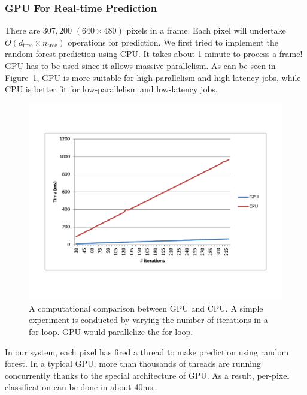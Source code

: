 \subsubsection{GPU For Real-time Prediction} 
There are $307,200$ $(640\times 480)$ pixels in a frame. Each pixel will undertake $O(d_{\text{tree}}\times n_{\text{tree}})$ operations for prediction. We first tried to implement the random forest prediction using CPU. It takes about 1 minute to process a frame! GPU has to be used since it allows massive parallelism. As can be seen in Figure~\ref{fig: GPUvsCPU}, GPU is more suitable for high-parallelism and high-latency jobs, while CPU is better fit for low-parallelism and low-latency jobs. 

\begin{figure}
	\includegraphics[width=0.45 \textwidth]{fig/GPUvsCPU.pdf}   
    \caption{A computational comparison between GPU and CPU. A simple experiment is conducted by varying the number of iterations in a for-loop. GPU would parallelize the for loop.}
    \label{fig: GPUvsCPU}
\end{figure}

In our system, each pixel has fired a thread to make prediction using random forest. In a typical GPU, more than thousands of threads are running concurrently thanks to the special architecture of GPU. As a result, per-pixel classification can be done in about 40ms .    
